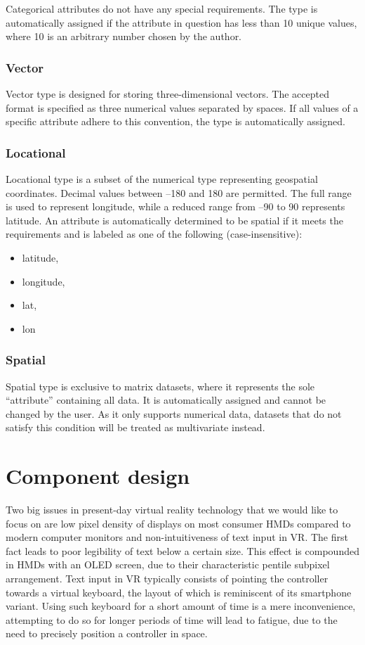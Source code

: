 \documentclass[thesis=M,english,hidelinks]{FITthesisXE}[2012/06/26]
\begin{document}
Categorical attributes do not have any special requirements. The type is automatically assigned if the attribute in question has less than 10 unique values, where 10 is an arbitrary number chosen by the author.

\subsubsection{Vector}

Vector type is designed for storing three-dimensional vectors. The accepted format is specified as three numerical values separated by spaces. If all values of a specific attribute adhere to this convention, the type is automatically assigned.

\subsubsection{Locational}

Locational type is a subset of the numerical type representing geospatial coordinates. Decimal values between --180 and 180 are permitted. The full range is used to represent longitude, while a reduced range from --90 to 90 represents latitude. An attribute is automatically determined to be spatial if it meets the requirements and is labeled as one of the following (case-insensitive):

\begin{itemize}
\item latitude,
\item longitude,
\item lat,
\item lon
\end{itemize}

\subsubsection{Spatial}

Spatial type is exclusive to matrix datasets, where it represents the sole “attribute” containing all data. It is automatically assigned and cannot be changed by the user. As it only supports numerical data, datasets that do not satisfy this condition will be treated as multivariate instead.

\section{Component design}

Two big issues in present-day virtual reality technology that we would like to focus on are low pixel density of displays on most consumer HMDs compared to modern computer monitors and non-intuitiveness of text input in VR. The first fact leads to poor legibility of text below a certain size. This effect is compounded in HMDs with an OLED screen, due to their characteristic pentile subpixel arrangement. Text input in VR typically consists of pointing the controller towards a virtual keyboard, the layout of which is reminiscent of its smartphone variant. Using such keyboard for a short amount of time is a mere inconvenience, attempting to do so for longer periods of time will lead to fatigue, due to the need to precisely position a controller in space.
\end{document}
